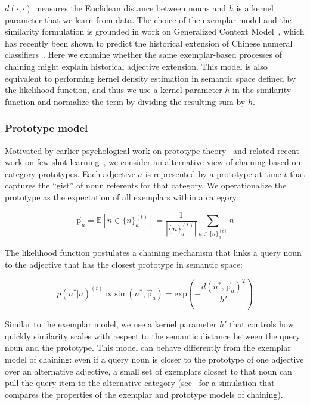 \documentclass[output=paper]{langsci/langscibook}
\begin{document}
$d\left(\cdot, \cdot\right)$ measures the Euclidean distance between nouns and $h$ is a kernel parameter that we learn from data. The choice of the exemplar model and the similarity formulation is grounded in work on Generalized Context Model~\citep{nosofsky1986}, which has recently been shown to predict the historical extension of Chinese numeral classifiers~\citep{habibi}. Here we examine whether the same exemplar-based processes of chaining might explain historical adjective extension. This model is also equivalent to performing kernel density estimation in semantic space defined by the likelihood function, and thus we use a kernel parameter $h$ in the similarity function and normalize the term by dividing the resulting sum by $h$. 




\subsubsection{Prototype model}\largerpage

Motivated by earlier psychological work on prototype theory~\citep{rosch1975} and related recent work on few-shot learning~\citep{snell2017}, we consider an alternative view of chaining based on category prototypes. Each adjective $a$ is represented by a prototype at time $t$ that captures the ``gist'' of noun referents for that category. We operationalize the prototype as the expectation of all exemplars within a category:

\begin{equation}
    \vec{\text{p}}_a = \mathbb{E}\left[n \in \{n\}_a^{(t)}\right] = \frac{1}{\left|\{n\}_a^{(t)}\right|} \sum_{n \in \{n\}_a^{(t)}} n \label{proto}
\end{equation}

The likelihood function postulates a chaining mechanism that links a query noun to the adjective that has the closest prototype in semantic space:

\begin{equation}
        p(n^*|a)^{(t)} \propto \text{sim}(n^*, \vec{\text{p}}_a) = \text{exp}\left(-\frac{d(n^*,\vec{\text{p}}_a)^2}{h'}\right) \label{prototype}
\end{equation}

Similar to the exemplar model, we use a kernel parameter $h'$ that controls how quickly similarity scales with respect to the semantic distance between the query noun and the prototype. This model can behave differently from the exemplar model of chaining: even if a query noun is closer to the prototype of one adjective over an alternative adjective, a small set of exemplars closest to that noun can pull the query item to the alternative category (see~\citealp{habibi} for a simulation that compares the properties of the exemplar and prototype models of chaining).   
\end{document}

